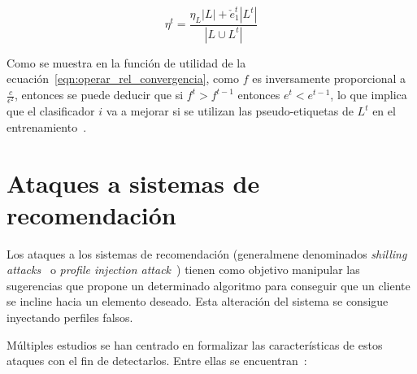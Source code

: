 \begin{equation}\label{eqn:ruido_it_tritraining} \eta^{t} = \frac{\eta_{L}|L| + \check{e}_{1}^{t}|L^{t}|}{|L \cup L^{t}|} \end{equation} 

Como se muestra en la función de utilidad de la ecuación~\ref{eqn:operar_rel_convergencia}, como $f$ es inversamente proporcional a  $\frac{c}{\epsilon^{2}}$, entonces se puede deducir que si $f^t > f^{t-1}$ entonces $e^t < e^{t-1}$, lo que implica que el clasificador $i$ va a mejorar si se utilizan las pseudo-etiquetas de $L^t$ en el entrenamiento~\cite{tritraining2005@original}.

\section{Ataques a sistemas de recomendación}

Los ataques a los sistemas de recomendación (generalmene denominados \textit{shilling attacks}~\cite{mingdan2018ShillingAttacksAReview} o \textit{profile injection attack}~\cite{Mobasher2006Thesis}) tienen como objetivo manipular las sugerencias que propone un determinado algoritmo para conseguir que un cliente se incline hacia un elemento deseado. Esta alteración del sistema se consigue inyectando perfiles falsos.

Múltiples estudios se han centrado en formalizar las características de estos ataques con el fin de detectarlos. Entre ellas se encuentran~\cite{mingdan2018ShillingAttacksAReview}:

